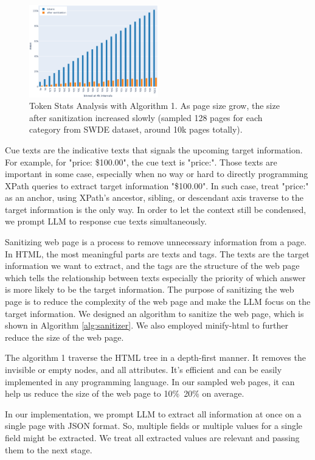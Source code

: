\documentclass[a4paper]{article}
\begin{document}
\begin{figure}[h]
  \centering
  \includegraphics[width=0.5\textwidth]{./ie_token_stats.eps}
  \caption{Token Stats Analysis with Algorithm 1. As page size grow, the size after sanitization increased slowly (sampled 128 pages for each category from SWDE dataset, around 10k pages totally).}
  \label{fig:ie_token_stats}
\end{figure}

Cue texts are the indicative texts that signals the upcoming target information. For example, for "price: \$100.00", the cue text is "price:". Those texts are important in some case, especially when no way or hard to directly programming XPath queries to extract target information "\$100.00". In such case, treat "price:" as an anchor, using XPath's ancestor, sibling, or descendant axis traverse to the target information is the only way. In order to let the context still be condensed, we prompt LLM to response cue texts simultaneously.

Sanitizing web page is a process to remove unnecessary information from a page. In HTML, the most meaningful parts are texts and tags. The texts are the target information we want to extract, and the tags are the structure of the web page which tells the relationship between texts especially the priority of which answer is more likely to be the target information. The purpose of sanitizing the web page is to reduce the complexity of the web page and make the LLM focus on the target information. We designed an algorithm to sanitize the web page, which is shown in Algorithm \ref{alg:sanitizer}. We also employed minify-html\cite{minifyhtml} to further reduce the size of the web page.

The algorithm 1 traverse the HTML tree in a depth-first manner. It removes the invisible or empty nodes, and all attributes. It's efficient and can be easily implemented in any programming language. In our sampled web pages, it can help us reduce the size of the web page to 10\%~20\% on average.

In our implementation, we prompt LLM to extract all information at once on a single page with JSON format. So, multiple fields or multiple values for a single field might be extracted. We treat all extracted values are relevant and passing them to the next stage.
\end{document}
